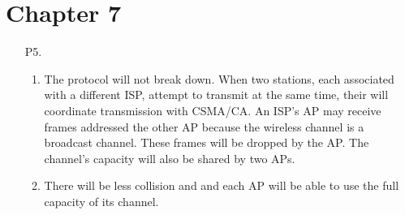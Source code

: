 \documentclass{article}
\begin{document}
\section*{Chapter 7}

\begin{enumerate}
    \item[P5.] \begin{enumerate}
        \item The protocol will not break down. When two stations, each associated with a different ISP, attempt to transmit at the same time, their will coordinate transmission with CSMA/CA. An ISP's AP may receive frames addressed the other AP because the wireless channel is a broadcast channel. These frames will be dropped by the AP. The channel's capacity will also be shared by two APs.
        \item There will be less collision and and each AP will be able to use the full capacity of its channel.
    \end{enumerate}
\end{enumerate}
\end{document}
